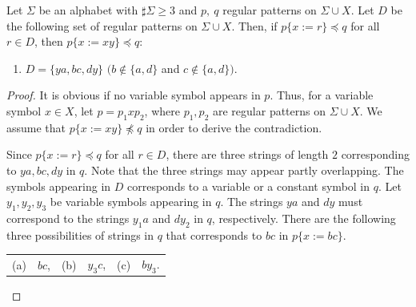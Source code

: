 
\begin{lem}\label{追加部分}
  Let $\Sigma$ be an alphabet with $\sharp\Sigma \ge 3$ and $p,~q$ regular patterns on $\Sigma\cup X$.
  Let $D$ be the following set of regular patterns on $\Sigma\cup X$.
  Then, if $p \{ x := r \} \preceq q$ for all $r \in D$, then $p \{ x := xy \} \preceq q$:
  \begin{enumerate}
  \item[] $D = \{ ya, bc, dy \}$ $(b \not\in \{a,d\}$ and $c \not\in \{a,d\})$.
  \end{enumerate}
\end{lem}

  \begin{proof}
  It is obvious if no variable symbol appears in $p$.
  Thus, for a variable symbol $x\in X$, let $p=p_{1}xp_{2}$, where $p_{1}, p_{2}$ are regular patterns on $\Sigma\cup X$.
  We assume that $p \{ x := xy \} \not \preceq q$ in order to derive the contradiction.

  Since $p \{ x := r \} \preceq q$ for all $r \in D$, there are three strings of length $2$ corresponding to $ya, bc, dy$ in $q$.
  Note that the three strings may appear partly overlapping.
  The symbols appearing in $D$ corresponds to a variable or a constant symbol in $q$.
  Let $y_{1}, y_{2}, y_{3}$ be variable symbols appearing in $q$.
  The strings $ya$ and $dy$ must correspond to the strings $y_{1}a$ and $dy_{2}$ in $q$, respectively.
  There are the following three possibilities of strings in $q$ that corresponds to $bc$ in $p\{x:=bc\}$.
  \begin{center}
    \begin{tabular}{cccccc}
      \textrm{(a)} & $bc$, & \textrm{(b)} & $y_{3}c$, & \textrm{(c)} & $by_{3}$.
    \end{tabular}
  \end{center}


\end{proof}
